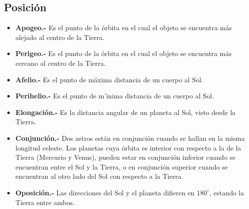 \documentclass[12pt,a4paper,oneside]{article}
\begin{document}
\subsection{Posici\'on}
\begin{itemize}
\item \textbf{Apogeo.-} Es el punto de la órbita en el cual el objeto se encuentra más alejado al centro de la Tierra.
\item \textbf{Perigeo.-} Es el punto de la órbita en el cual el objeto se encuentra más cercano al centro de la Tierra.
\item \textbf{Afelio.-} Es el punto de máxima distancia de un cuerpo al Sol.
\item \textbf{Perihelio.-} Es el punto de m'inima distancia de un cuerpo al Sol.
\item \textbf{Elongaci\'on.-} Es la distancia angular de un planeta al Sol, visto desde la Tierra.
\item \textbf{Conjunci\'on.-} Dos astros están en conjunción cuando se hallan en la misma longitud celeste. Los planetas cuya órbita es interior con respecto a la de la Tierra (Mercurio y Venus), pueden estar en conjunción inferior cuando se encuentran entre el Sol y la Tierra, o en conjunción superior cuando se encuentran al otro lado del Sol con respecto a la Tierra. 
\item \textbf{Oposición.-} Las direcciones del Sol y el planeta difieren en $180^\circ$, estando la Tierra entre ambos.
\end{itemize}
\end{document}
